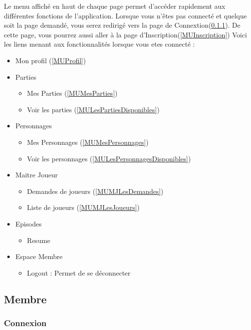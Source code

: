 \documentclass[a4paper,oneside,10pt]{article}
\begin{document}
Le menu affiché en haut de chaque page permet d'accéder rapidement aux différentes fonctions de l'application. Lorsque vous n'êtes pas connecté et quelque soit la page demandé, vous serez redirigé vers la page de Connextion(\ref{MUConnexion}). De cette page, vous pourrez aussi aller à la page d'Inscription(\ref{MUInscription})
Voici les liens menant aux fonctionnalités lorsque vous etes connecté :
\begin{itemize}
	\item Mon profil (\ref{MUProfil})
	\item Parties
	\begin{itemize}
		\item Mes Parties (\ref{MUMesParties})
		\item Voir les parties (\ref{MULesPartiesDisponibles})
	\end{itemize}
	\item Personnages
	\begin{itemize}
		\item Mes Personnages (\ref{MUMesPersonnages})
		\item Voir les personnages (\ref{MULesPersonnagesDisponibles})
	\end{itemize}
	\item Maitre Joueur
	\begin{itemize}
		\item Demandes de joueurs (\ref{MUMJLesDemandes})
		\item Liste de joueurs (\ref{MUMJLesJoueurs})
	\end{itemize}
	\item Episodes 
	\begin{itemize}
		\item Resume
	\end{itemize}
	\item Espace Membre
	\begin{itemize}
		\item Logout : Permet de se déconnecter
	\end{itemize}
\end{itemize}

\subsection{Membre}

\subsubsection{Connexion}
\label{MUConnexion}
\end{document}
